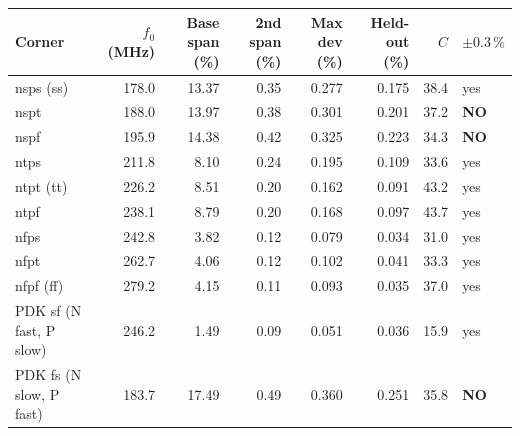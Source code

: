 \begin{tabular}{lrrrrrrl}\toprule
Corner & $f_0$ (MHz) & Base span (\%) & 2nd span (\%) & Max dev (\%) & Held-out (\%) & $C$ & $\pm0.3\,\%$ \\\midrule
nsps (ss) & 178.0 & 13.37 & 0.35 & 0.277 & 0.175 & 38.4 & yes \\
nspt & 188.0 & 13.97 & 0.38 & 0.301 & 0.201 & 37.2 & \textbf{\textcolor{warn}{NO}} \\
nspf & 195.9 & 14.38 & 0.42 & 0.325 & 0.223 & 34.3 & \textbf{\textcolor{warn}{NO}} \\
ntps & 211.8 & 8.10 & 0.24 & 0.195 & 0.109 & 33.6 & yes \\
ntpt (tt) & 226.2 & 8.51 & 0.20 & 0.162 & 0.091 & 43.2 & yes \\
ntpf & 238.1 & 8.79 & 0.20 & 0.168 & 0.097 & 43.7 & yes \\
nfps & 242.8 & 3.82 & 0.12 & 0.079 & 0.034 & 31.0 & yes \\
nfpt & 262.7 & 4.06 & 0.12 & 0.102 & 0.041 & 33.3 & yes \\
nfpf (ff) & 279.2 & 4.15 & 0.11 & 0.093 & 0.035 & 37.0 & yes \\
PDK sf (N fast, P slow) & 246.2 & 1.49 & 0.09 & 0.051 & 0.036 & 15.9 & yes \\
PDK fs (N slow, P fast) & 183.7 & 17.49 & 0.49 & 0.360 & 0.251 & 35.8 & \textbf{\textcolor{warn}{NO}} \\
\bottomrule\end{tabular}